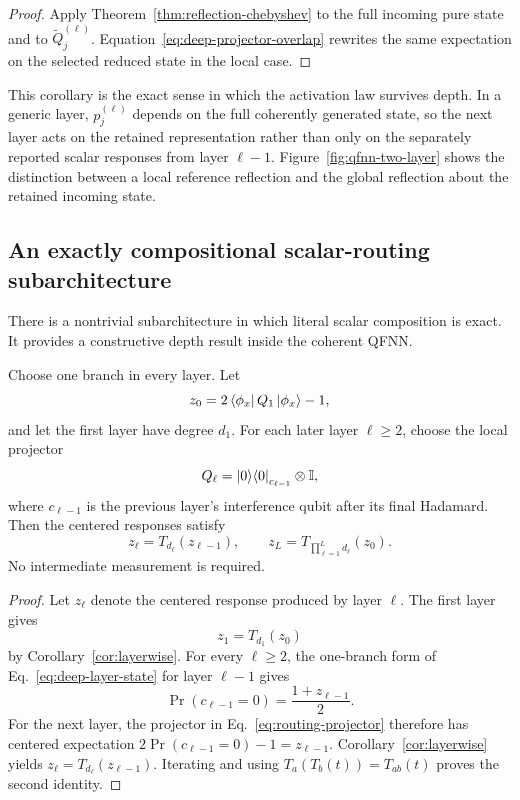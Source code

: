 \documentclass[pdflatex,sn-mathphys,NameDate,iicol]{sn-jnl}
\newcommand{\id}{\mathbb{I}}
\newcommand{\proj}[1]{\ket{#1}\!\bra{#1}}
\begin{document}
\begin{proof}
Apply Theorem~\ref{thm:reflection-chebyshev} to the full incoming pure state
and to $\widetilde Q_j^{(\ell)}$.
Equation~\eqref{eq:deep-projector-overlap} rewrites the same expectation on
the selected reduced state in the local case.
\end{proof}

This corollary is the exact sense in which the activation law survives
depth. In a generic layer, $p_j^{(\ell)}$ depends on the full coherently
generated state, so the next layer acts on the retained representation rather
than only on the separately reported scalar responses from layer $\ell-1$.
Figure~\ref{fig:qfnn-two-layer} shows the distinction between a local
reference reflection and the global reflection about the retained incoming
state.

\subsection{An exactly compositional scalar-routing subarchitecture}
\label{sec:scalar-routing}

There is a nontrivial subarchitecture in which literal scalar composition is
exact. It provides a constructive depth result inside the coherent QFNN.

\begin{theorem}
\label{thm:scalar-routing}
Choose one branch in every layer. Let
\begin{equation}
  z_0=2\bra{\phi_x}Q_1\ket{\phi_x}-1,
\end{equation}
and let the first layer have degree $d_1$. For each later layer $\ell\ge2$,
choose the local projector
\begin{equation}
 Q_\ell=\proj0_{c_{\ell-1}}\otimes\id,
 \label{eq:routing-projector}
\end{equation}
where $c_{\ell-1}$ is the previous layer's interference qubit after its
final Hadamard. Then the centered responses satisfy
\begin{equation}
 z_\ell=T_{d_\ell}(z_{\ell-1}),
 \qquad
 z_L=T_{\prod_{\ell=1}^{L}d_\ell}(z_0).
 \label{eq:exact-degree-product}
\end{equation}
No intermediate measurement is required.
\end{theorem}

\begin{proof}
Let $z_\ell$ denote the centered response produced by layer $\ell$.
The first layer gives
\begin{equation}
 z_1=T_{d_1}(z_0)
\end{equation}
by Corollary~\ref{cor:layerwise}. For every $\ell\ge2$, the one-branch form
of Eq.~\eqref{eq:deep-layer-state} for layer $\ell-1$ gives
\begin{equation}
 \Pr(c_{\ell-1}=0)
 =\frac{1+z_{\ell-1}}{2}.
\end{equation}
For the next layer, the projector in
Eq.~\eqref{eq:routing-projector} therefore has centered expectation
$2\Pr(c_{\ell-1}=0)-1=z_{\ell-1}$. Corollary~\ref{cor:layerwise} yields
$z_\ell=T_{d_\ell}(z_{\ell-1})$. Iterating and using
$T_a(T_b(t))=T_{ab}(t)$ proves the second identity.
\end{proof}
\end{document}
